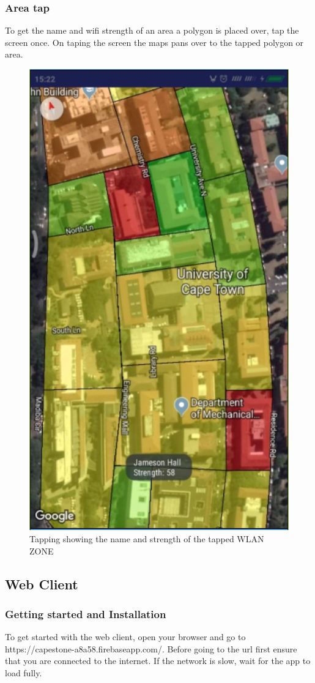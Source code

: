 \subsubsection{Area tap}
To get the name and wifi strength of an area a polygon is placed over, tap the screen once. On taping the screen the maps pans over to the tapped polygon or area.
\begin{figure}
	\centering
	\includegraphics[width=0.7\linewidth]{images_manual/tap}
	\caption{Tapping showing the name and strength of the tapped WLAN ZONE}
	\label{fig:tap}
\end{figure}


\subsection{Web Client}
\subsubsection{Getting started and Installation}
To get started with the web client, open your browser and go to
https://capestone-a8a58.firebaseapp.com/. Before going to the url first ensure that you are connected to the internet. If the network is slow, wait for the app to load fully.

